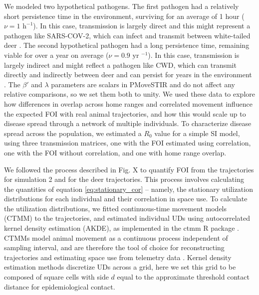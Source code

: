 \documentclass[letterpaper]{article}
\begin{document}
We modeled two hypothetical pathogens. The first pathogen had a relatively short persistence time in the environment, surviving for an average of 1 hour  ($\nu=1\text{ h}^{-1 }$). In this case, transmission is largely direct and this might represent a pathogen like SARS-COV-2, which can infect and transmit between white-tailed deer \citep{Hale2022}. The second hypothetical pathogen had a long persistence time, remaining viable for over a year on average ($\nu=0.9 \text{ yr }^{-1}$). In this case, transmission is largely indirect and might reflect a pathogen like CWD, which can transmit directly and indirectly between deer and can persist for years in the environment \citep{Saunders2012a}. The $\beta'$ and $\lambda$ parameters are scalars in PMoveSTIR and do not affect any relative comparisons, so we set them both to unity. %
We used these data to explore how differences in overlap across home ranges and correlated movement influence the expected FOI with real animal trajectories, and how this would scale up to disease spread through a network of multiple individuals. To characterize disease spread across the population, we estimated a $R_0$ value for a simple SI model, using three transmission matrices, one with the FOI estimated using correlation, one with the FOI without correlation, and one with home range overlap. 

We followed the process described in Fig. X to quantify FOI from the trajectories for simulation 2 and for the deer trajectories. This process involves calculating the quantities of equation \ref{eq:stationary_cor} -- namely, the stationary utilization distributions for each individual and their correlation in space use.  To calculate the utilization distributions, we fitted continuous-time movement models (CTMM) to the trajectories, and estimated individual UDs using autocorrelated kernel density estimation (AKDE), as implemented in the ctmm R package \citep{Fleming2014, Calabrese2016,Fleming2022}. CTMMs model animal movement as a continuous process independent of sampling interval, and are therefore the tool of choice for reconstructing trajectories and estimating space use from telemetry data \citep{Fleming2014}. 
Kernel density estimation methods discretize UDs across a grid, here we set this grid to be composed of square cells with side $d$ equal to the approximate threshold contact distance for epidemiological contact. %
\end{document}

